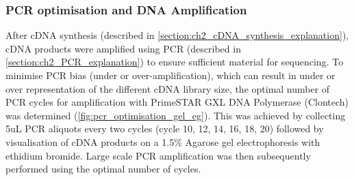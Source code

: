 \subsubsection{PCR optimisation and DNA Amplification}
\label{ch: pcr_optimisation}
After cDNA synthesis (described in \cref{section:ch2_cDNA_synthesis_explanation}), cDNA products were amplified using PCR (described in \cref{section:ch2_PCR_explanation}) to ensure sufficient material for sequencing. To minimise PCR bias (under or over-amplification), which can result in under or over representation of the different cDNA library size, the optimal number of PCR cycles for amplification with PrimeSTAR GXL DNA Polymerase (Clontech) was determined (\cref{fig:pcr_optimisation_gel_eg}). This was achieved by collecting 5uL PCR aliquots every two cycles (cycle 10, 12, 14, 16, 18, 20) followed by visualisation of cDNA products on a 1.5\% Agarose gel electrophoresis with ethidium bromide. Large scale PCR amplification was then subsequently performed using the optimal number of cycles.


